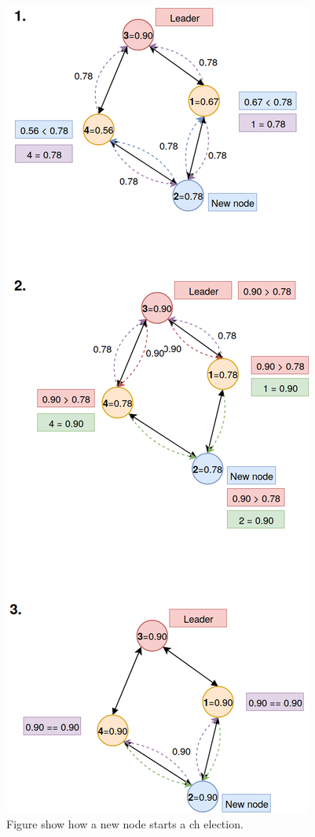 \documentclass[USenglish]{uit-thesis}
\begin{document}
\begin{figure}
\centering
\includegraphics[scale=0.3]{newNodeLeaderElection.png}
\caption{Figure show how a new node starts a \gls{ch} election.}
\label{fig:newNodeLeaderElection}
\end{figure}
\end{document}
